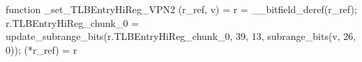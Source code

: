 function _set_TLBEntryHiReg_VPN2 (r_ref, v) = {
    r = __bitfield_deref(r_ref);
    r.TLBEntryHiReg_chunk_0 = update_subrange_bits(r.TLBEntryHiReg_chunk_0, 39, 13, subrange_bits(v, 26, 0));
    (*r_ref) = r
}
